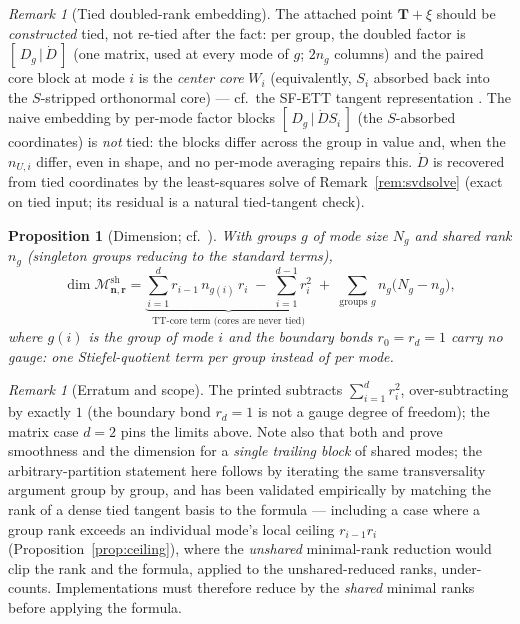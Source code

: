 \documentclass[11pt]{article}
\newtheorem{proposition}[theorem]{Proposition}
\theoremstyle{definition}
\theoremstyle{remark}
\newtheorem{remark}[theorem]{Remark}
\newcommand{\T}{\boldsymbol{T}}
\newcommand{\Msh}{\mathcal{M}^{\mathrm{sh}}_{\boldsymbol{n},\boldsymbol{r}}}
\begin{document}
\begin{remark}[Tied doubled-rank embedding]\label{rem:embedding}
The attached point $\T + \xi$ should be \emph{constructed} tied, not re-tied
after the fact: per group, the doubled factor is $[\,D_g \,|\, \dot D\,]$
(one matrix, used at every mode of $g$; $2 n_g$ columns) and the paired core
block at mode $i$ is the \emph{center core} $W_i$ (equivalently, $S_i$
absorbed back into the $S$-stripped orthonormal core) --- cf.\ the SF-ETT
tangent representation \cite[\S 5.2]{MR2026}. The naive embedding by
per-mode factor blocks $[\,D_g \,|\, \dot D S_i\,]$ (the $S$-absorbed
coordinates) is \emph{not} tied: the blocks differ across the group in value
and, when the $n_{U,i}$ differ, even in shape, and no per-mode averaging
repairs this. $\dot D$ is recovered from tied coordinates by the
least-squares solve of Remark~\ref{rem:svdsolve} (exact on tied input; its
residual is a natural tied-tangent check).
\end{remark}

\begin{proposition}[Dimension; cf.~{\cite[Thm.~5]{MR2026}}]\label{prop:dim}
With groups $g$ of mode size $N_g$ and shared rank $n_g$ (singleton groups
reducing to the standard terms),
\[
\dim \Msh
= \underbrace{\sum_{i=1}^{d} r_{i-1}\, n_{g(i)}\, r_i
  \;-\; \sum_{i=1}^{d-1} r_i^2}_{\text{TT-core term (cores are never tied)}}
\;+\; \sum_{\text{groups } g} n_g \bigl( N_g - n_g \bigr),
\]
where $g(i)$ is the group of mode $i$ and the boundary bonds
$r_0 = r_d = 1$ carry no gauge: one Stiefel-quotient term per \emph{group}
instead of per mode.
\end{proposition}

\begin{remark}[Erratum and scope]
The printed \cite[Thm.~5]{MR2026} subtracts $\sum_{i=1}^{d} r_i^2$,
over-subtracting by exactly $1$ (the boundary bond $r_d = 1$ is not a gauge
degree of freedom); the matrix case $d = 2$ pins the limits above. Note also
that both \cite{MR2026} and \cite{Pesh2024} prove smoothness and the
dimension for a \emph{single trailing block} of shared modes; the
arbitrary-partition statement here follows by iterating the same
transversality argument group by group, and has been validated empirically by
matching the rank of a dense tied tangent basis to the formula --- including
a case where a group rank exceeds an individual mode's local ceiling
$r_{i-1} r_i$ (Proposition~\ref{prop:ceiling}), where the \emph{unshared}
minimal-rank reduction would clip the rank and the formula, applied to the
unshared-reduced ranks, under-counts. Implementations must therefore reduce
by the \emph{shared} minimal ranks before applying the formula.
\end{remark}
\end{document}
